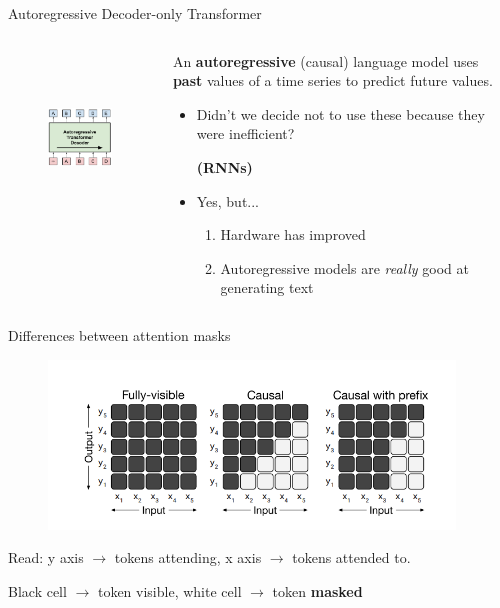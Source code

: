 \documentclass[12pt,aspectratio=169,handout]{beamer}
\begin{document}
\begin{frame}{Autoregressive Decoder-only Transformer}
	\begin{columns}[T] %
		\begin{column}{.48\textwidth}
	\begin{figure}[h]
		\includegraphics[height=4.5cm]{autoregressive_trf_decoder.pdf}
	\end{figure}
\end{column}
	
\begin{column}{.48\textwidth}
	An \textbf{autoregressive} (causal) language model uses \textbf{past} values of a time series to predict future values.
	\pause
	\begin{itemize}
		\item Didn't we decide not to use these because they were inefficient?
		\pause \begin{center} \textbf{(RNNs)} \end{center}
		\pause
		\item Yes, but... 
		\begin{enumerate}
			\item Hardware has improved
			\item Autoregressive models are \textit{really} good at generating text
		\end{enumerate}
	\end{itemize}
\end{column}
\end{columns}

\end{frame}

\begin{frame}{Differences between attention masks}
	\begin{figure}[h]
		\includegraphics[height=4.5cm]{attention-types}
	\end{figure}
	Read: y axis $\to$ tokens attending, x axis $\to$ tokens attended to.
	
	Black cell $\to$ token visible, white cell $\to$ token \textbf{masked}
\end{frame}
\end{document}
